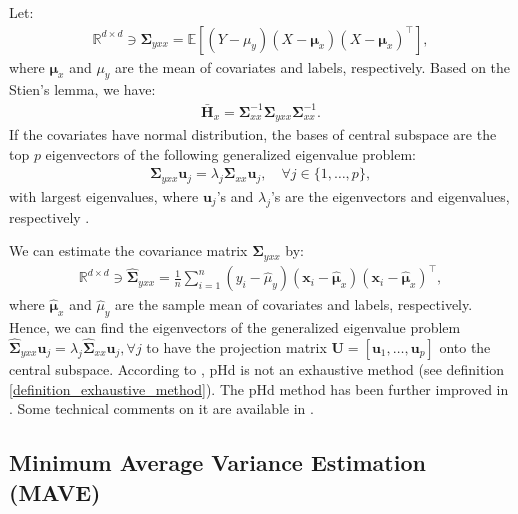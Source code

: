 \documentclass[lang=cn,10pt]{gorgeousnbook}
\numberwithin{equation}{section}%
\numberwithin{figure}{section}%
\begin{document}
\begin{theorem}[]
Let:
\begin{align*}
\mathbb{R}^{d \times d} \ni \boldsymbol{\Sigma}_{yxx} = \mathbb{E}[(Y - \mu_y) (X - \boldsymbol{\mu}_x) (X - \boldsymbol{\mu}_x)^\top],
\end{align*}
where $\boldsymbol{\mu}_x$ and $\mu_y$ are the mean of covariates and labels, respectively. 
Based on the Stien's lemma, we have:
\begin{align*}
\bar{\boldsymbol{H}}_x = \boldsymbol{\Sigma}_{xx}^{-1} \boldsymbol{\Sigma}_{yxx} \boldsymbol{\Sigma}_{xx}^{-1}.
\end{align*}
If the covariates have normal distribution, the bases of central subspace are the top $p$ eigenvectors of the following generalized eigenvalue problem:
\begin{align*}
\boldsymbol{\Sigma}_{yxx} \boldsymbol{u}_j = \lambda_j \boldsymbol{\Sigma}_{xx} \boldsymbol{u}_j, \quad \forall j \in \{1, \dots, p\},
\end{align*}
with largest eigenvalues, where $\boldsymbol{u}_j$'s and $\lambda_j$'s are the eigenvectors and eigenvalues, respectively \cite{ghojogh2019eigenvalue}. 
\end{theorem}

We can estimate the covariance matrix $\boldsymbol{\Sigma}_{yxx}$ by:
\begin{align*}
\mathbb{R}^{d \times d} \ni \widehat{\boldsymbol{\Sigma}}_{yxx} = \frac{1}{n} \sum_{i=1}^n (y_i - \widehat{\mu}_y) (\boldsymbol{x}_i - \widehat{\boldsymbol{\mu}}_x) (\boldsymbol{x}_i - \widehat{\boldsymbol{\mu}}_x)^\top,
\end{align*}
where $\widehat{\boldsymbol{\mu}}_x$ and $\widehat{\mu}_y$ are the sample mean of covariates and labels, respectively. 
Hence, we can find the eigenvectors of the generalized eigenvalue problem $\widehat{\boldsymbol{\Sigma}}_{yxx} \boldsymbol{u}_j = \lambda_j \widehat{\boldsymbol{\Sigma}}_{xx} \boldsymbol{u}_j, \forall j$ to have the projection matrix $\boldsymbol{U} = [\boldsymbol{u}_1, \dots, \boldsymbol{u}_p]$ onto the central subspace. 
According to \cite{li2007directional}, pHd is not an exhaustive method (see definition \ref{definition_exhaustive_method}). 
The pHd method has been further improved in \cite{cook1998principal,cook2002dimension,cook2004determining}. Some technical comments on it are available in \cite{li1998principal}.

\subsection{Minimum Average Variance Estimation (MAVE)}
\end{document}
